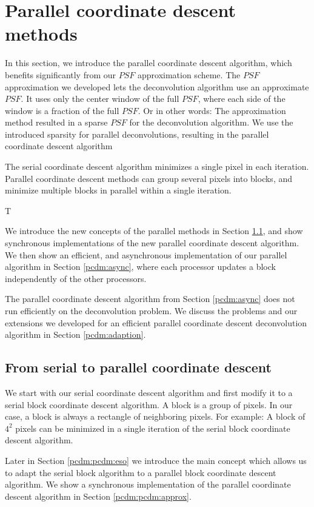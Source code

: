 \section{Parallel coordinate descent methods}\label{pcdm}
In this section, we introduce the parallel coordinate descent algorithm, which benefits significantly from our $PSF$ approximation scheme. The $PSF$ approximation we developed lets the deconvolution algorithm use an approximate $PSF$. It uses only the center window of the full $PSF$, where each side of the window is a fraction of the full $PSF$. Or in other words: The approximation method resulted in a sparse $PSF$ for the deconvolution algorithm. We use the introduced sparsity for parallel deconvolutions, resulting in the parallel coordinate descent algorithm

The serial coordinate descent algorithm minimizes a single pixel in each iteration. Parallel coordinate descent methods can group several pixels into blocks, and minimize multiple blocks in parallel within a single iteration. 

T

We introduce the new concepts of the parallel methods in Section \ref{pcdm:pcdm}, and show synchronous implementations of the new parallel coordinate descent algorithm. We then show an efficient, and asynchronous implementation of our parallel algorithm in Section \ref{pcdm:async}, where each processor updates a block independently of the other processors.


The parallel coordinate descent algorithm from Section \ref{pcdm:async} does not run efficiently on the deconvolution problem. We discuss the problems and our extensions we developed for an efficient parallel coordinate descent deconvolution algorithm in Section \ref{pcdm:adaption}.


\subsection{From serial to parallel coordinate descent}\label{pcdm:pcdm}
We start with our serial coordinate descent algorithm and first modify it to a serial block coordinate descent algorithm. A block is a group of pixels. In our case, a block is always a rectangle of neighboring pixels. For example: A block of $4^2$ pixels can be minimized in a single iteration of the serial block coordinate descent algorithm.

Later in Section \ref{pcdm:pcdm:eso} we introduce the main concept which allows us to adapt the serial block algorithm to a parallel block coordinate descent algorithm. We show a synchronous implementation of the parallel coordinate descent algorithm in Section \ref{pcdm:pcdm:approx}.



